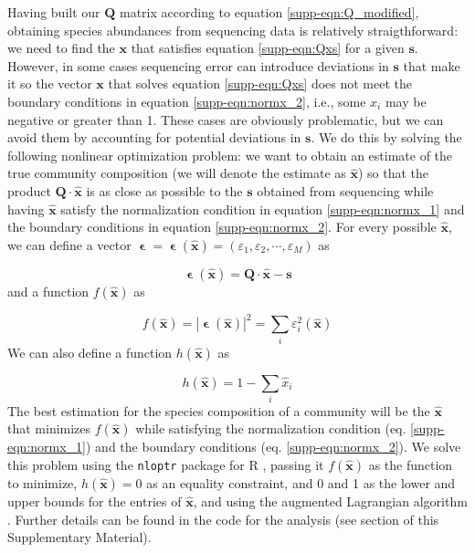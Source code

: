 \documentclass[a4paper,10pt]{article}
\begin{document}
Having built our $\mathbf{Q}$ matrix according to equation
\ref{supp-eqn:Q_modified}, obtaining species abundances from sequencing data
is relatively straigthforward: we need to find the $\mathbf{x}$ that satisfies
equation \ref{supp-eqn:Qxs} for a given $\mathbf{s}$. However, in some cases
sequencing error can introduce deviations in $\mathbf{s}$ that make it so the
vector $\mathbf{x}$ that solves equation \ref{supp-eqn:Qxs} does not meet the
boundary conditions in equation \ref{supp-eqn:normx_2}, i.e., some $x_i$ may be
negative or greater than 1. These cases are obviously problematic, but we can
avoid them by accounting for potential deviations in $\mathbf{s}$. We do this
by solving the following nonlinear optimization problem: we want to obtain an
estimate of the true community composition
(we will denote the estimate as $\mathbf{\hat{x}}$) so that the product
$\mathbf{Q} \cdot \mathbf{\hat{x}}$ is as close as possible to the $\mathbf{s}$
obtained from sequencing while
having $\mathbf{\hat{x}}$ satisfy the normalization condition in equation
\ref{supp-eqn:normx_1} and the boundary conditions in equation
\ref{supp-eqn:normx_2}. For every possible $\mathbf{\hat{x}}$, we can define a vector
$\boldsymbol{\upvarepsilon} = \boldsymbol{\upvarepsilon} \left( \mathbf{\hat{x}} \right) = 
\left( \varepsilon_1, \varepsilon_2, \cdots, \varepsilon_M \right)$ as

\begin{equation}
\boldsymbol{\upvarepsilon} \left( \mathbf{\hat{x}} \right) =
\mathbf{Q} \cdot \mathbf{\hat{x}} - \mathbf{s}
\end{equation}
%
and a function $f \left( \mathbf{\hat{x}} \right)$ as

\begin{equation}
f \left( \mathbf{\hat{x}} \right) =
\left| \boldsymbol{\upvarepsilon} \left( \mathbf{\hat{x}} \right) \right| ^2 =
\sum_i \varepsilon_i^2 \left( \mathbf{\hat{x}} \right)
\end{equation}
%
We can also define a function $h \left( \mathbf{\hat{x}} \right)$ as

\begin{equation}
h \left( \mathbf{\hat{x}} \right) = 1 - \sum_i\hat{x}_i
\end{equation}
%
The best estimation for the species composition of a community will be the
$\mathbf{\hat{x}}$ that minimizes $f \left( \mathbf{\hat{x}} \right)$ while
satisfying the normalization condition (eq. \ref{supp-eqn:normx_1}) and the
boundary conditions (eq. \ref{supp-eqn:normx_2}). We solve
this problem using the \texttt{nloptr} package for R \cite{nloptr}, passing it
$f \left( \mathbf{\hat{x}} \right)$ as the function to minimize,
$h \left( \mathbf{\hat{x}} \right) = 0$ as an equality constraint,
and 0 and 1
as the lower and upper bounds for the entries of $\mathbf{\hat{x}}$, and using
the augmented Lagrangian algorithm \cite{auglag1,auglag2}. Further
details can be found in the code for the analysis (see section 
 of this Supplementary Material).
\end{document}
